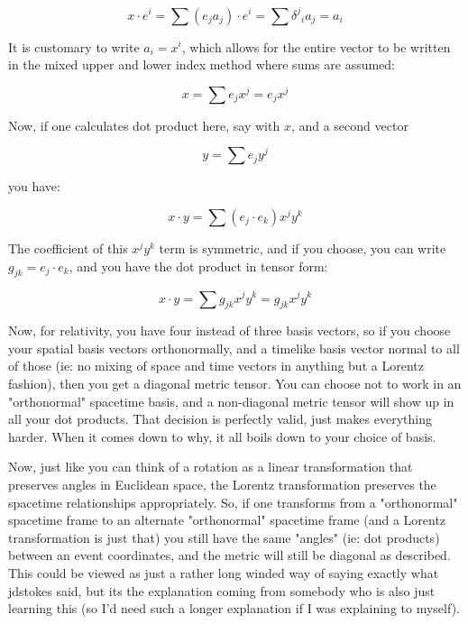 \begin{equation*}
x \cdot e^i = \sum (e_j a_j) \cdot e^i = \sum {\delta^j}_i a_j = a_i
\end{equation*}

It is customary to write $a_i = x^i$, which allows for the entire vector to
be written in the mixed upper and lower index method where sums are assumed:

\begin{equation*}
x = \sum e_j x^j = e_j x^j
\end{equation*}

Now, if one calculates dot product here, say with $x$, and a second vector

\begin{equation*}
y = \sum e_j y^j
\end{equation*}

you have:

\begin{equation*}
x \cdot y = \sum (e_j \cdot e_k) x^j y^k
\end{equation*}

The coefficient of this $x^j y^k$ term is symmetric, and if you choose, you
can write $g_{jk} = e_j \cdot e_k$, and you have the dot product in 
tensor form:

\begin{equation*}
x \cdot y = \sum g_{jk} x^j y^k = g_{jk} x^j y^k
\end{equation*}

Now, for relativity, you have four instead of three basis vectors, so if you choose your spatial basis vectors orthonormally, and a timelike basis vector normal to all of those (ie: no mixing of space and time vectors in anything but a Lorentz fashion), then you get a diagonal metric tensor.  You can choose not to work in an "orthonormal" spacetime basis, and a non-diagonal metric tensor will show up in all your dot products.  That decision is perfectly valid, just makes everything harder.  When it comes down to why, it all boils down to your choice of basis.

Now, just like you can think of a rotation as a linear transformation that preserves angles in Euclidean space, the Lorentz transformation preserves the spacetime relationships appropriately.  So, if one transforms from a "orthonormal" spacetime frame to an alternate "orthonormal" spacetime frame (and a Lorentz transformation is just that) you still have the same "angles" (ie: dot products) between an event coordinates, and the metric will still be diagonal as described.  This could be viewed as just a rather long winded way of saying exactly what jdstokes said, but its the explanation coming from somebody who is also just learning this (so I'd need such a longer explanation if I was explaining to myself).

